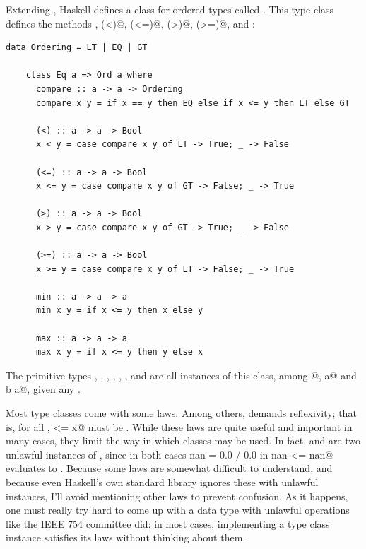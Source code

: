 \documentclass[UdineBachThesis,american,11pt]{PhdThesis}
\begin{document}
  Extending \lstinline@Eq@, Haskell defines a class for ordered types called
  \lstinline@Ord@. This type class defines the methods \lstinline@compare@,
  \lstinline@(<)@, \lstinline@(<=)@, \lstinline@(>)@, \lstinline@(>=)@,
  \lstinline@min@ and \lstinline@max@:

  \begin{lstlisting}[gobble=4,basicstyle=\ttfamily\small]
    data Ordering = LT | EQ | GT

    class Eq a => Ord a where
      compare :: a -> a -> Ordering
      compare x y = if x == y then EQ else if x <= y then LT else GT

      (<) :: a -> a -> Bool
      x < y = case compare x y of LT -> True; _ -> False

      (<=) :: a -> a -> Bool
      x <= y = case compare x y of GT -> False; _ -> True

      (>) :: a -> a -> Bool
      x > y = case compare x y of GT -> True; _ -> False

      (>=) :: a -> a -> Bool
      x >= y = case compare x y of LT -> False; _ -> True

      min :: a -> a -> a
      min x y = if x <= y then x else y

      max :: a -> a -> a
      max x y = if x <= y then y else x
  \end{lstlisting}

  The primitive types \lstinline@Int@, \lstinline@Word@, \lstinline@Integer@,
  \lstinline@Float@, \lstinline@Double@, \lstinline@Rational@, \lstinline@Bool@
  and \lstinline@Char@ are all instances of this class, among \lstinline@[a]@,
  \lstinline@Maybe a@ and \lstinline@Either b a@, given any \lstinline@a@.

  Most type classes come with some laws. Among others, \lstinline@Ord@ demands
  reflexivity; that is, for all \lstinline@x@, \lstinline@x <= x@ must be
  \lstinline@True@. While these laws are quite useful and important in many
  cases, they limit the way in which classes may be used. In fact,
  \lstinline@Float@ and \lstinline@Double@ are two unlawful instances of
  \lstinline@Ord@, since in both cases
  \lstinline@let nan = 0.0 / 0.0 in nan <= nan@ evaluates to \lstinline@False@.
  Because some laws are somewhat difficult to understand, and because even
  Haskell's own standard library ignores these with unlawful instances, I'll
  avoid mentioning other laws to prevent confusion. As it happens, one must
  really try hard to come up with a data type with unlawful operations like the
  IEEE 754 committee did: in most cases, implementing a type class instance
  satisfies its laws without thinking about them.
\end{document}
